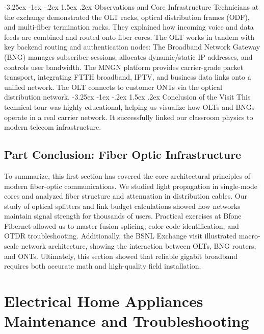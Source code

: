 \documentclass[11pt,a4paper]{report}
\makeatletter
\renewcommand{\section}{\@startsection{section}{1}{\z@}%
  {-3.25ex \@plus -1ex \@minus -.2ex}%
  {1.5ex \@plus.2ex}%
  {\normalfont\Large\bfseries\color{primaryColor}}}
\makeatother
\begin{document}
\section{Observations and Core Infrastructure}
Technicians at the exchange demonstrated the OLT racks, optical distribution frames (ODF), and multi-fiber termination racks. They explained how incoming voice and data feeds are combined and routed onto fiber cores. The OLT works in tandem with key backend routing and authentication nodes: The Broadband Network Gateway (BNG) manages subscriber sessions, allocates dynamic/static IP addresses, and controls user bandwidth. The MNGN platform provides carrier-grade packet transport, integrating FTTH broadband, IPTV, and business data links onto a unified network. The OLT connects to customer ONTs via the optical distribution network.
\section{Conclusion of the Visit}
This technical tour was highly educational, helping us visualize how OLTs and BNGs operate in a real carrier network. It successfully linked our classroom physics to modern telecom infrastructure.
\chapter*{Part Conclusion: Fiber Optic Infrastructure}
To summarize, this first section has covered the core architectural principles of modern fiber-optic communications. We studied light propagation in single-mode cores and analyzed fiber structure and attenuation in distribution cables. Our study of optical splitters and link budget calculations showed how networks maintain signal strength for thousands of users. Practical exercises at Bfone Fibernet allowed us to master fusion splicing, color code identification, and OTDR troubleshooting. Additionally, the BSNL Exchange visit illustrated macro-scale network architecture, showing the interaction between OLTs, BNG routers, and ONTs. Ultimately, this section showed that reliable gigabit broadband requires both accurate math and high-quality field installation.
\part{Electrical Home Appliances Maintenance and Troubleshooting}
\end{document}
